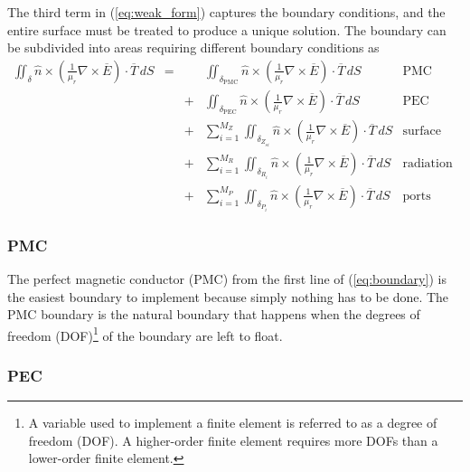 \documentclass[titlepage]{article}
\renewcommand\_{\textunderscore\linebreak[1]}
\begin{document}
The third term in (\ref{eq:weak_form}) captures the boundary conditions, and the entire surface must be treated to produce a unique solution.  The boundary can be subdivided into areas requiring different boundary conditions as
\begin{equation}
\label{eq:boundary}
\begin{array}{rcclr}
\iint_{\delta}\hat{n}\times(\frac{1}{\mu_r}\nabla\times\overline{E})\cdot\overline{T}\,dS & = &   & \iint_{\delta_{\text{PMC}}}\hat{n}\times(\frac{1}{\mu_r}\nabla\times\overline{E})\cdot\overline{T}\,dS & \text{PMC} \\[5pt]
                                                                                          &   & + & \iint_{\delta_{\text{PEC}}}\hat{n}\times(\frac{1}{\mu_r}\nabla\times\overline{E})\cdot\overline{T}\,dS & \text{PEC} \\[5pt]
                                                                                          &   & + & \sum_{i=1}^{M_Z}\iint_{\delta_{Z_{si}}}\hat{n}\times(\frac{1}{\mu_r}\nabla\times\overline{E})\cdot\overline{T}\,dS & \text{surface impedance}\\[5pt]
                                                                                          &   & + & \sum_{i=1}^{M_R}\iint_{\delta_{R_{i}}}\hat{n}\times(\frac{1}{\mu_r}\nabla\times\overline{E})\cdot\overline{T}\,dS & \text{radiation}\\[5pt]
                                                                                          &   & + & \sum_{i=1}^{M_P}\iint_{\delta_{P_{i}}}\hat{n}\times(\frac{1}{\mu_r}\nabla\times\overline{E})\cdot\overline{T}\,dS  & \text{ports}
\end{array}
\end{equation}

\subsubsection{PMC}

The perfect magnetic conductor (PMC) from the first line of (\ref{eq:boundary}) is the easiest boundary to implement because simply nothing has to be done. The PMC boundary is the natural boundary that happens when the degrees of freedom (DOF)\footnote{A variable used to implement a finite element is referred to as a degree of freedom (DOF).  A higher-order finite element requires more DOFs than a lower-order finite element.} of the boundary are left to float.

\subsubsection{PEC}
\end{document}
